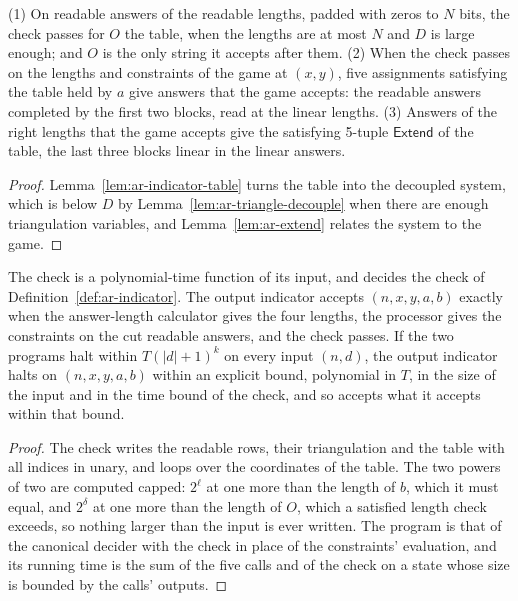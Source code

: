 \begin{lemma}
\label{lem:ar-indicator-properties}
\leanok
(1) On readable answers of the readable lengths, padded with zeros to $N$ bits, the check passes
for $O$ the table, when the lengths are at most $N$ and $D$ is large enough; and $O$ is the only
string it accepts after them. (2) When the check passes on the lengths and constraints of the game
at $(x, y)$, five assignments satisfying the table held by $a$ give answers that the game accepts:
the readable answers completed by the first two blocks, read at the linear lengths. (3) Answers
of the right lengths that the game accepts give the satisfying 5-tuple $\mathsf{Extend}$ of the
table, the last three blocks linear in the linear answers.
\end{lemma}

\begin{proof}
\leanok
Lemma~\ref{lem:ar-indicator-table} turns the table into the decoupled system, which is below $D$
by Lemma~\ref{lem:ar-triangle-decouple} when there are enough triangulation variables, and
Lemma~\ref{lem:ar-extend} relates the system to the game.
\end{proof}

\begin{lemma}
\label{lem:ar-indicator-program}
\leanok
The check is a polynomial-time function of its input, and decides the check of
Definition~\ref{def:ar-indicator}. The output indicator accepts $(n, x, y, a, b)$ exactly when the
answer-length calculator gives the four lengths, the processor gives the constraints on the cut
readable answers, and the check passes. If the two programs halt within $T (|d| + 1)^k$ on every
input $(n, d)$, the output indicator halts on $(n, x, y, a, b)$ within an explicit bound,
polynomial in $T$, in the size of the input and in the time bound of the check, and so accepts
what it accepts within that bound.
\end{lemma}

\begin{proof}
\leanok
The check writes the readable rows, their triangulation and the table with all indices in unary,
and loops over the coordinates of the table. The two powers of two are computed capped: $2^\ell$
at one more than the length of $b$, which it must equal, and $2^{\delta}$ at one more than the
length of $O$, which a satisfied length check exceeds, so nothing larger than the input is ever
written. The program is that of the canonical decider with the check in place of the
constraints' evaluation, and its running time is the sum of the five calls and of the check on a
state whose size is bounded by the calls' outputs.
\end{proof}

